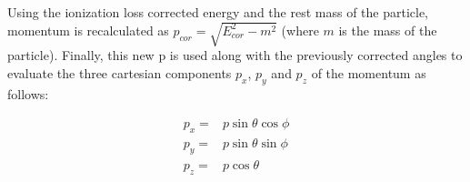     

    

Using the ionization loss corrected energy and the rest mass of the particle, momentum is recalculated as $p_{cor} = \sqrt{E^2_{cor}-m^2}$ 
(where $m$ is the mass of the particle). Finally, this new p is used along with the previously corrected angles to evaluate the three 
cartesian components $p_x$, $p_y$ and $p_z$ of the momentum as follows:

\begin{equation}
\begin{aligned}
  p_x   = & p \sin\theta \cos\phi \\
  p_y   = & p \sin\theta \sin\phi \\
  p_z   = & p \cos\theta 
\end{aligned}
\end{equation}




